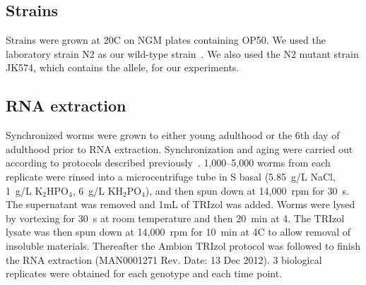 \subsection*{Strains}
\label{sub:Strains}
Strains were grown at 20\degree{}C on NGM plates containing \ecol{} OP50. We
used the laboratory \cel{} strain N2 as our wild-type strain~\citep{Brenner1974}.
We also used the N2 mutant strain JK574, which contains the 
allele, for our experiments.

\subsection*{RNA extraction}
\label{sb:rna_extraction}
Synchronized worms were grown to either young adulthood or the 6th day of
adulthood prior to RNA extraction. Synchronization and aging were carried out
according to protocols described previously~\citep{Leighton2014}. 1,000--5,000
worms from each replicate were rinsed into a microcentrifuge tube in S basal
(5.85~g/L NaCl, 1~g/L $\mathrm{K}_2\mathrm{HPO}_4$, 6~g/L
$\mathrm{KH}_2\mathrm{PO}_4$), and then spun down at 14,000~rpm for 30~s. The
supernatant was removed and 1mL of TRIzol was added. Worms were lysed by
vortexing for 30~s at room temperature and then 20~min at 4\degree. The TRIzol
lysate was then spun down at 14,000~rpm for 10~min at 4\degree{}C to allow
removal of insoluble materials. Thereafter the Ambion TRIzol protocol was
followed to finish the RNA extraction (MAN0001271 Rev. Date: 13 Dec 2012).
3 biological replicates were obtained for each genotype and each time point.


